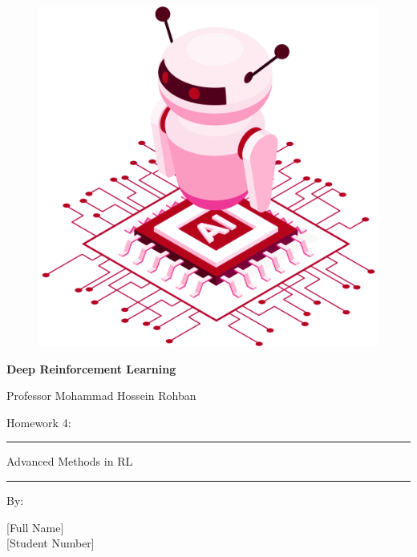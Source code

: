 \documentclass[12pt]{article}
\begin{document}
\thispagestyle{plain}

\begin{center}

\vspace*{-1.5cm}
\begin{figure}[!h]
    \centering
    \includegraphics[width=0.7\linewidth]{figs/cover-std.png}
\end{figure}

{

{\color{DarkBlue} {\fontsize{30}{50} \textbf{
Deep Reinforcement Learning
}}}

{\color{DarkBlue} {\Large
Professor Mohammad Hossein Rohban
}}
}


\vspace{20pt}

{


{\color{RedOrange}
{\Large
Homework 4:
}\\
}
{\color{BrickRed}
\rule{12cm}{0.5pt}

{\Huge
Advanced Methods in RL
}
\rule{12cm}{0.5pt}
}

\vspace{10pt}

{\color{RoyalPurple} { \small By:} } \\
\vspace{10pt}

{\color{Blue} { \LARGE [Full Name] } } \\
\vspace{5pt}
{\color{RoyalBlue} { \Large [Student Number] } }


}
\end{center}
\end{document}
